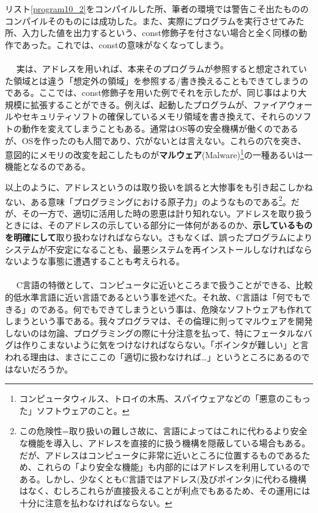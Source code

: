リスト\ref{program10_2}をコンパイルした所、筆者の環境では警告こそ出たもののコンパイルそのものには成功した。また、実際にプログラムを実行させてみた所、入力した値を出力するという、const修飾子を付さない場合と全く同様の動作であった。これでは、constの意味がなくなってしまう。
\\ \\　
実は、アドレスを用いれば、本来そのプログラムが参照すると想定されていた領域とは違う「想定外の領域」を参照する/書き換えることもできてしまうのである。ここでは、const修飾子を用いた例でそれを示したが、同じ事はより大規模に拡張することができる。例えば、起動したプログラムが、ファイアウォールやセキュリティソフトの確保しているメモリ領域を書き換えて、それらのソフトの動作を変えてしまうこともある。通常はOS等の安全機構が働くのであるが、OSを作ったのも人間であり、穴がないとは言えない。これらの穴を突き、意図的にメモリの改変を起こしたものが\textbf{マルウェア}(Malware)\footnote{コンピュータウィルス、トロイの木馬、スパイウェアなどの「悪意のこもった」ソフトウェアのこと。}の一種あるいは一機能となるのである。

以上のように、アドレスというのは取り扱いを誤ると大惨事をも引き起こしかねない、ある意味「プログラミングにおける原子力」のようなものである\footnote{この危険性=取り扱いの難しさ故に、言語によってはこれに代わるより安全な機能を導入し、アドレスを直接的に扱う機構を隠蔽している場合もある。だが、アドレスはコンピュータに非常に近いところに位置するものであるため、これらの「より安全な機能」も内部的にはアドレスを利用しているのである。しかし、少なくともC言語ではアドレス(及びポインタ)に代わる機構はなく、むしろこれらが直接扱えることが利点でもあるため、その運用には十分に注意を払わなければならない。}。だが、その一方で、適切に活用した時の恩恵は計り知れない。アドレスを取り扱うときには、そのアドレスの示している部分に一体何があるのか、\textbf{示しているものを明確にして}取り扱わなければならない。さもなくば、誤ったプログラムによりシステムが不安定になることも、最悪システムを再インストールしなければならないような事態に遭遇することも考えられる。
\\ \\　
C言語の特徴として、コンピュータに近いところまで扱うことができる、比較的低水準言語に近い言語であるという事を述べた。それ故、C言語は「何でもできる」のである。何でもできてしまうという事は、危険なソフトウェアも作れてしまうという事である。我々プログラマは、その倫理に則ってマルウェアを開発しないのは勿論、プログラミングの際に十分注意を払って、特にフェータルなバグは作りこまないように気をつけなければならない。「ポインタが難しい」と言われる理由は、まさにここの「適切に扱わなければ…」というところにあるのではないだろうか。

